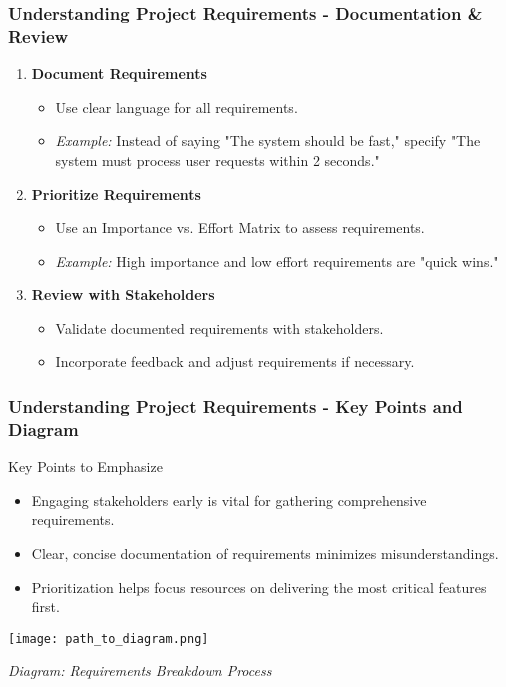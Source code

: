 \documentclass[aspectratio=169]{beamer}
\begin{document}
\begin{frame}[fragile]
    \frametitle{Understanding Project Requirements - Documentation & Review}
    \begin{enumerate}[resume]
        \item \textbf{Document Requirements}
            \begin{itemize}
                \item Use clear language for all requirements.
                \item \textit{Example:} Instead of saying "The system should be fast," specify "The system must process user requests within 2 seconds."
            \end{itemize}
        \item \textbf{Prioritize Requirements}
            \begin{itemize}
                \item Use an Importance vs. Effort Matrix to assess requirements.
                \item \textit{Example:} High importance and low effort requirements are "quick wins."
            \end{itemize}
        \item \textbf{Review with Stakeholders}
            \begin{itemize}
                \item Validate documented requirements with stakeholders.
                \item Incorporate feedback and adjust requirements if necessary.
            \end{itemize}
    \end{enumerate}
\end{frame}

\begin{frame}[fragile]
    \frametitle{Understanding Project Requirements - Key Points and Diagram}
    \begin{block}{Key Points to Emphasize}
        \begin{itemize}
            \item Engaging stakeholders early is vital for gathering comprehensive requirements.
            \item Clear, concise documentation of requirements minimizes misunderstandings.
            \item Prioritization helps focus resources on delivering the most critical features first.
        \end{itemize}
    \end{block}
    
    \begin{center}
        \texttt{[image: path\_to\_diagram.png]} %
    \end{center}
    \textit{Diagram: Requirements Breakdown Process}
\end{frame}
\end{document}
